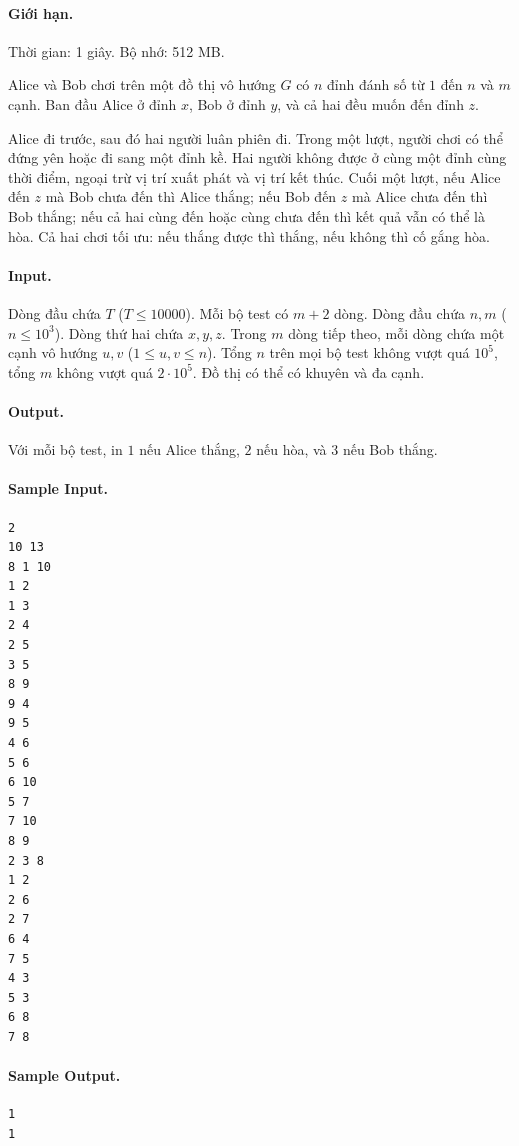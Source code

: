 \documentclass[11pt]{article}
\begin{document}
\paragraph{Giới hạn.} Thời gian: 1 giây. Bộ nhớ: 512 MB.

Alice và Bob chơi trên một đồ thị vô hướng $G$ có $n$ đỉnh đánh số từ $1$ đến
$n$ và $m$ cạnh.  Ban đầu Alice ở đỉnh $x$, Bob ở đỉnh $y$, và cả hai đều muốn
đến đỉnh $z$.

Alice đi trước, sau đó hai người luân phiên đi.  Trong một lượt, người chơi có
thể đứng yên hoặc đi sang một đỉnh kề.  Hai người không được ở cùng một đỉnh
cùng thời điểm, ngoại trừ vị trí xuất phát và vị trí kết thúc.  Cuối một lượt,
nếu Alice đến $z$ mà Bob chưa đến thì Alice thắng; nếu Bob đến $z$ mà Alice
chưa đến thì Bob thắng; nếu cả hai cùng đến hoặc cùng chưa đến thì kết quả vẫn
có thể là hòa.  Cả hai chơi tối ưu: nếu thắng được thì thắng, nếu không thì cố
gắng hòa.

\paragraph{Input.}
Dòng đầu chứa $T$ ($T\le 10000$).  Mỗi bộ test có $m+2$ dòng.  Dòng đầu chứa
$n,m$ ($n\le 10^3$).  Dòng thứ hai chứa $x,y,z$.  Trong $m$ dòng tiếp theo,
mỗi dòng chứa một cạnh vô hướng $u,v$ ($1\le u,v\le n$).  Tổng $n$ trên mọi bộ
test không vượt quá $10^5$, tổng $m$ không vượt quá $2\cdot 10^5$.  Đồ thị có
thể có khuyên và đa cạnh.

\paragraph{Output.}
Với mỗi bộ test, in $1$ nếu Alice thắng, $2$ nếu hòa, và $3$ nếu Bob thắng.

\paragraph{Sample Input.}
\begin{verbatim}
2
10 13
8 1 10
1 2
1 3
2 4
2 5
3 5
8 9
9 4
9 5
4 6
5 6
6 10
5 7
7 10
8 9
2 3 8
1 2
2 6
2 7
6 4
7 5
4 3
5 3
6 8
7 8
\end{verbatim}

\paragraph{Sample Output.}
\begin{verbatim}
1
1
\end{verbatim}
\end{document}
